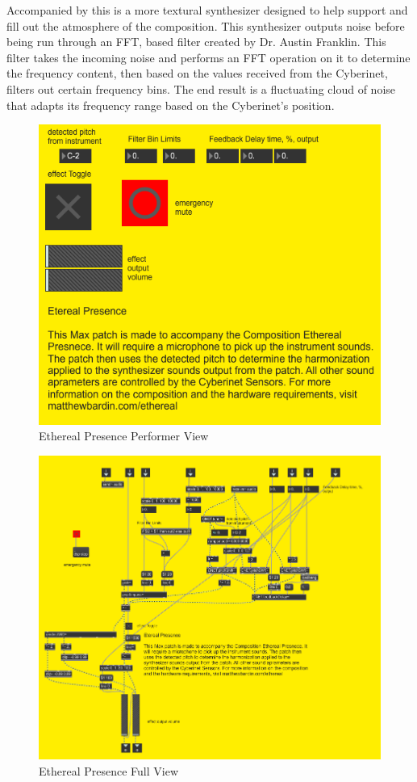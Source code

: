 Accompanied by this is a more textural synthesizer designed to help support and fill out the atmosphere of the composition. This synthesizer outputs noise before being run through an FFT, based filter created by Dr. Austin Franklin. This filter takes the incoming noise and performs an FFT operation on it to determine the frequency content, then based on the values received from the Cyberinet, filters out certain frequency bins. The end result is a fluctuating cloud of noise that adapts its frequency range based on the Cyberinet's position.


\begin{figure}
    \centering
    \includegraphics{diagrams/maxPatches/ethereal_pres.png}
    \caption{Ethereal Presence Performer View}
    \label{fig:etherealPerf}
\end{figure}

\begin{figure}
    \centering
    \includegraphics[scale=0.75]{diagrams/maxPatches/ethereal_raw.png}
    \caption{Ethereal Presence Full View}
    \label{fig:etherealRaw}
\end{figure}

